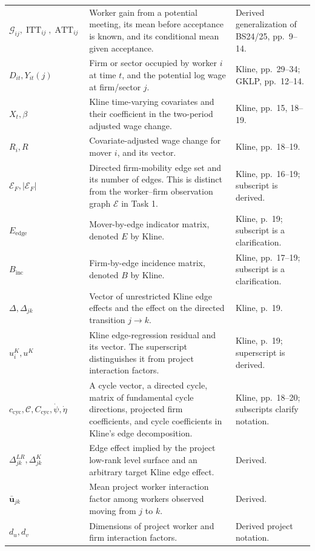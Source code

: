 \documentclass[11pt]{article}
\begin{document}
\begin{longtable}{p{}p{}p{}}
\(\mathcal G_{ij},\operatorname{ITT}_{ij},\operatorname{ATT}_{ij}\) & Worker gain from
a potential meeting, its mean before acceptance is known, and its conditional
mean given acceptance. & Derived generalization of BS24/25,
pp.\ 9--14. \\
\(D_{it},Y_{it}(j)\) & Firm or sector occupied by worker \(i\) at time \(t\),
and the potential log wage at firm/sector \(j\). & Kline, pp.\ 29--34;
GKLP, pp.\ 12--14. \\
\(X_t,\beta\) & Kline time-varying covariates and their coefficient in the
two-period adjusted wage change. & Kline, pp.\ 15, 18--19. \\
\(R_i,R\) & Covariate-adjusted wage change for mover \(i\), and its vector. &
Kline, pp.\ 18--19. \\
\(\mathcal E_F,|\mathcal E_F|\) & Directed firm-mobility edge set and its
number of edges.  This is distinct from the worker--firm observation graph
\(\mathcal E\) in Task 1. & Kline, pp.\ 16--19; subscript is derived. \\
\(E_{\mathrm{edge}}\) & Mover-by-edge indicator matrix, denoted \(E\) by
Kline. & Kline, p.\ 19; subscript is a clarification. \\
\(B_{\mathrm{inc}}\) & Firm-by-edge incidence matrix, denoted \(B\) by
Kline. & Kline, pp.\ 17--19; subscript is a clarification. \\
\(\Delta,\Delta_{jk}\) & Vector of unrestricted Kline edge effects and the
effect on the directed transition \(j\to k\). & Kline, p.\ 19. \\
\(u^{K}_i,u^K\) & Kline edge-regression residual and its vector.  The
superscript distinguishes it from project interaction factors. & Kline,
p.\ 19; superscript is derived. \\
\(c_{\mathrm{cyc}},\mathcal C,C_{\mathrm{cyc}},\dot\psi,\dot\eta\) & A cycle
vector, a directed cycle, matrix of fundamental cycle directions, projected
firm coefficients, and cycle coefficients in Kline's edge decomposition. &
Kline, pp.\ 18--20; subscripts clarify notation. \\
\(\Delta^{LR}_{jk},\Delta^K_{jk}\) & Edge effect implied by the project
low-rank level surface and an arbitrary target Kline edge effect. & Derived. \\
\(\bar{\mathbf u}_{jk}\) & Mean project worker interaction factor among
workers observed moving from \(j\) to \(k\). & Derived. \\
\(d_u,d_v\) & Dimensions of project worker and firm interaction factors. &
Derived project notation. \\

\end{longtable}
\end{document}
